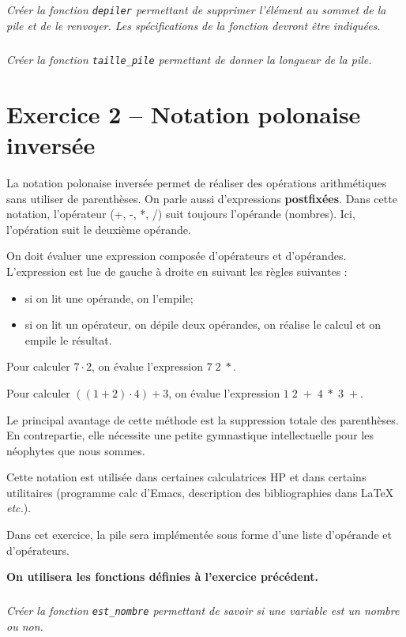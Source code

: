 \documentclass[10pt,fleqn]{article} %
\begin{document}
\begin{multicols}{2}
\subparagraph{}\textit{Créer la fonction \texttt{depiler} permettant de supprimer l'élément au sommet de la pile et de le renvoyer. Les spécifications de la fonction devront être indiquées.}

\subparagraph{}\textit{Créer la fonction \texttt{taille\_pile} permettant de donner la longueur de la pile.}


\section*{Exercice 2 -- Notation polonaise inversée}
\setcounter{exo}{0}
La notation polonaise inversée permet de réaliser des opérations arithmétiques sans utiliser de parenthèses. On parle aussi d'expressions \textbf{postfixées}. Dans cette notation, l'opérateur (+, -, *, /) suit toujours l'opérande (nombres). Ici, l'opération suit le deuxième opérande.

On doit évaluer une expression composée d'opérateurs et d'opérandes. L'expression est lue de gauche à droite en suivant les règles suivantes :
\begin{itemize}
\item si on lit une opérande, on l'empile;
\item si on lit un opérateur, on dépile deux opérandes, on réalise le calcul et on empile le résultat. 
\end{itemize}
\begin{exemple}
Pour calculer $7\cdot 2$, on évalue l'expression $7\;2\; *$.

Pour calculer $((1 + 2) \cdot 4) + 3$, on évalue l'expression $1\;2\;+\;4\;*\;3\;+$.
\end{exemple} 


\begin{rem}
Le principal avantage de cette méthode est la suppression totale des parenthèses. En contrepartie, elle nécessite une petite gymnastique intellectuelle pour les néophytes que nous sommes.

Cette notation est utilisée dans certaines calculatrices HP et dans certains utilitaires (programme calc d'Emacs, description des bibliographies dans LaTeX \textit{etc.}).
\end{rem}

Dans cet exercice, la pile sera implémentée sous forme d'une liste d'opérande et d'opérateurs. 

\textbf{On utilisera les fonctions définies à l'exercice précédent.}
 
\subparagraph{}\textit{Créer la fonction \texttt{est\_nombre} permettant de savoir si une variable est un nombre ou non.}


\end{multicols}
\end{document}
